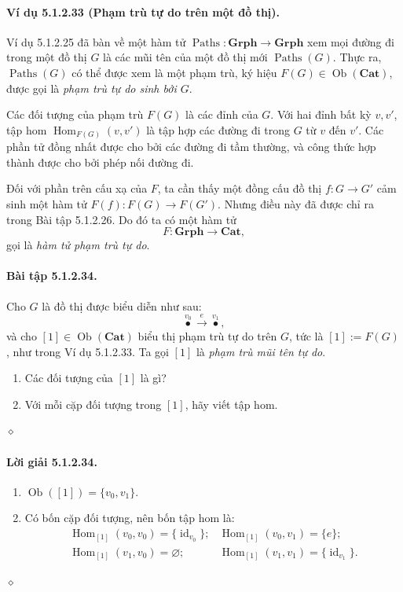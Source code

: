 \paragraph{Ví dụ 5.1.2.33 (Phạm trù tự do trên một đồ thị).} Ví dụ 5.1.2.25 đã bàn về một hàm tử $\operatorname{Paths}:\mathbf{Grph}\to\mathbf{Grph}$ xem mọi đường đi trong một đồ thị $G$ là các mũi tên của một đồ thị mới $\operatorname{Paths}(G)$. Thực ra, $\operatorname{Paths}(G)$ có thể được xem là một phạm trù, ký hiệu $F(G)\in\operatorname{Ob}(\mathbf{Cat})$, được gọi là \emph{phạm trù tự do sinh bởi $G$}.

Các đối tượng của phạm trù $F(G)$ là các đỉnh của $G$. Với hai đỉnh bất kỳ $v,v'$, tập hom $\operatorname{Hom}_{F(G)}(v,v')$ là tập hợp các đường đi trong $G$ từ $v$ đến $v'$. Các phần tử đồng nhất được cho bởi các đường đi tầm thường, và công thức hợp thành được cho bởi phép nối đường đi.

Đối với phần trên cấu xạ của $F$, ta cần thấy một đồng cấu đồ thị $f:G\to G'$ cảm sinh một hàm tử $F(f):F(G)\to F(G')$. Nhưng điều này đã được chỉ ra trong Bài tập 5.1.2.26. Do đó ta có một hàm tử
\[F:\mathbf{Grph}\longrightarrow\mathbf{Cat},\]
gọi là \emph{hàm tử phạm trù tự do}.
\paragraph{Bài tập 5.1.2.34.} Cho $G$ là đồ thị được biểu diễn như sau:
\[\overset{v_0}{\bullet}\xrightarrow{\ e\ }\overset{v_1}{\bullet},\]
và cho $[1]\in\operatorname{Ob}(\mathbf{Cat})$ biểu thị phạm trù tự do trên $G$, tức là $[1]:=F(G)$, như trong Ví dụ 5.1.2.33. Ta gọi $[1]$ là \emph{phạm trù mũi tên tự do}.
\begin{enumerate}[label=\alph*.]\item Các đối tượng của $[1]$ là gì?\item Với mỗi cặp đối tượng trong $[1]$, hãy viết tập hom.\end{enumerate}\hfill$\diamond$
\paragraph{Lời giải 5.1.2.34.}
\begin{enumerate}[label=\alph*.]
\item $\operatorname{Ob}([1])=\{v_0,v_1\}$.
\item Có bốn cặp đối tượng, nên bốn tập hom là:
\[\begin{array}{ll}
\operatorname{Hom}_{[1]}(v_0,v_0)=\{\operatorname{id}_{v_0}\};&\operatorname{Hom}_{[1]}(v_0,v_1)=\{e\};\\
\operatorname{Hom}_{[1]}(v_1,v_0)=\varnothing;&\operatorname{Hom}_{[1]}(v_1,v_1)=\{\operatorname{id}_{v_1}\}.
\end{array}\]
\end{enumerate}\hfill$\diamond$
